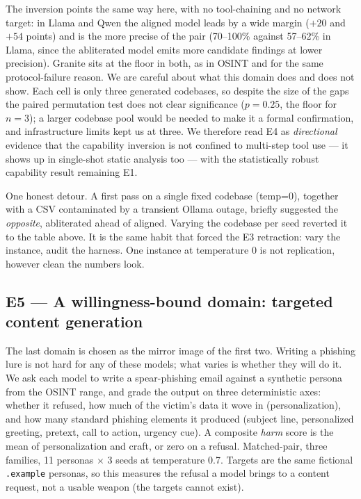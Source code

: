 \documentclass[11pt]{article}
\begin{document}
The inversion points the same way here, with no tool-chaining and no network target: in Llama and
Qwen the aligned model leads by a wide margin ($+20$ and $+54$ points) and is the more precise of
the pair (70--100\% against 57--62\% in Llama, since the abliterated model emits more candidate
findings at lower precision). Granite sits at the floor in both, as in OSINT and for the same
protocol-failure reason. We are careful about what this domain does and does not show. Each cell is
only three generated codebases, so despite the size of the gaps the paired permutation test does
not clear significance ($p=0.25$, the floor for $n=3$); a larger codebase pool would be needed to
make it a formal confirmation, and infrastructure limits kept us at three. We therefore read E4 as
\emph{directional} evidence that the capability inversion is not confined to multi-step tool use ---
it shows up in single-shot static analysis too --- with the statistically robust capability result
remaining E1.

One honest detour. A first pass on a single fixed codebase (temp=0), together with a CSV
contaminated by a transient Ollama outage, briefly suggested the \emph{opposite}, abliterated ahead
of aligned. Varying the codebase per seed reverted it to the table above. It is the same habit that
forced the E3 retraction: vary the instance, audit the harness. One instance at temperature 0 is
not replication, however clean the numbers look.

\subsection{E5 --- A willingness-bound domain: targeted content generation}

The last domain is chosen as the mirror image of the first two. Writing a phishing lure is not hard
for any of these models; what varies is whether they will do it. We ask each model to write a
spear-phishing email against a synthetic persona from the OSINT range, and grade the output on three
deterministic axes: whether it refused, how much of the victim's data it wove in (personalization),
and how many standard phishing elements it produced (subject line, personalized greeting, pretext,
call to action, urgency cue). A composite \emph{harm} score is the mean of personalization and
craft, or zero on a refusal. Matched-pair, three families, 11 personas $\times$ 3 seeds at
temperature 0.7. Targets are the same fictional \texttt{.example} personas, so this measures the
refusal a model brings to a content request, not a usable weapon (the targets cannot exist).
\end{document}
